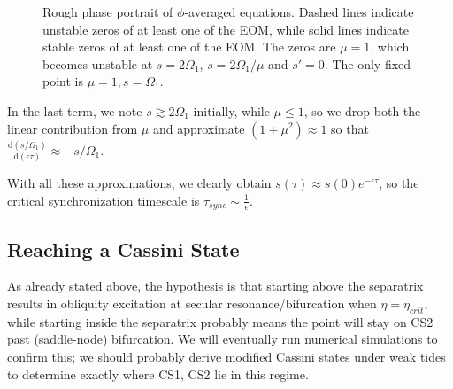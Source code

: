 \documentclass[11pt,
        usenames, %
        dvipsnames %
    ]{article}
\newcommand*{\rd}[2]{\frac{\mathrm{d}#1}{\mathrm{d}#2}}
\newcommand*{\p}[1]{\left(#1\right)}
\begin{document}
\begin{figure}[t]
    \centering
    \caption{Rough phase portrait of $\phi$-averaged equations. Dashed lines
    indicate unstable zeros of at least one of the EOM, while solid lines
    indicate stable zeros of at least one of the EOM\@. The zeros are $\mu = 1$,
    which becomes unstable at $s = 2\Omega_1$, $s = 2\Omega_1/\mu$ and $s' = 0$.
    The only fixed point is $\mu = 1, s = \Omega_1$.}\label{fig:phi_avg}
\end{figure}
In the last term, we note $s \gtrsim 2\Omega_1$ initially, while $\mu \leq 1$,
so we drop both the linear contribution from $\mu$ and approximate $\p{1 +
\mu^2} \approx 1$ so that $\rd{(s/\Omega_1)}{(\epsilon\tau)} \approx
-s/\Omega_1$.

With all these approximations, we clearly obtain $s(\tau) \approx
s(0)e^{-\epsilon \tau}$, so the critical synchronization
timescale is $\tau_{sync} \sim \frac{1}{\epsilon}$.

\subsection{Reaching a Cassini State}

As already stated above, the hypothesis is that starting above the separatrix
results in obliquity excitation at secular resonance/bifurcation when $\eta =
\eta_{crit}$, while starting inside the separatrix probably means the point will
stay on CS2 past (saddle-node) bifurcation. We will eventually run numerical
simulations to confirm this; we should probably derive modified Cassini states
under weak tides to determine exactly where CS1, CS2 lie in this regime.
\end{document}

